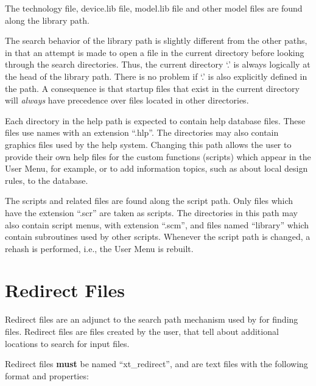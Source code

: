 The technology file, {\vt device.lib} file, {\vt model.lib} file and
other model files are found along the library path.

The search behavior of the library path is slightly different from the
other paths, in that an attempt is made to open a file in the current
directory before looking through the search directories.  Thus, the
current directory `.' is always logically at the head of the library
path.  There is no problem if `.' is also explicitly defined in the
path.  A consequence is that startup files that exist in the current
directory will {\it always} have precedence over files located in
other directories.

Each directory in the help path is expected to contain help database
files.  These files use names with an extension ``{\vt .hlp}''.  The
directories may also contain graphics files used by the help system. 
Changing this path allows the user to provide their own help files for
the custom functions (scripts) which appear in the {\cb User Menu},
for example, or to add information topics, such as about local design
rules, to the database.

The scripts and related files are found along the script path.  Only
files which have the extension ``{\vt .scr}'' are taken as scripts. 
The directories in this path may also contain script menus, with
extension ``{\vt .scm}'', and files named ``{\vt library}'' which
contain subroutines used by other scripts.  Whenever the script path
is changed, a {\cb rehash} is performed, i.e., the {\cb User Menu} is
rebuilt.


\section{Redirect Files}
Redirect files are an adjunct to the search path mechanism used by
{\Xic} for finding files.  Redirect files are files created by the
user, that tell {\Xic} about additional locations to search for input
files.

Redirect files {\bf must} be named ``{\vt xt\_redirect}'', and are
text files with the following format and properties:

